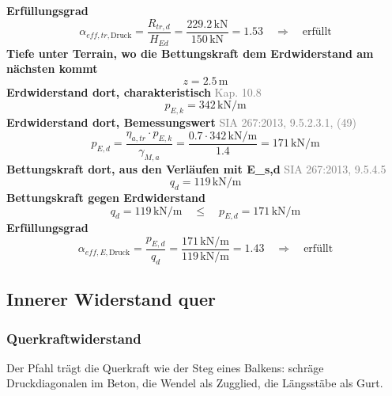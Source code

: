 \documentclass[11pt,a4paper]{article}
\newcommand{\normref}[1]{{\small\textcolor{gray}{#1}}}
\begin{document}
\noindent\textbf{Erfüllungsgrad}
\begin{equation*}
\alpha_{eff,tr,\text{Druck}} = \frac{R_{tr,d}}{H_{Ed}} = \frac{229.2\,\mathrm{kN}}{150\,\mathrm{kN}} = 1.53 \quad \Rightarrow \quad \text{erfüllt}
\end{equation*}
\noindent\textbf{Tiefe unter Terrain, wo die Bettungskraft dem Erdwiderstand am nächsten kommt}
\begin{equation*}
z = 2.5\,\mathrm{m}
\end{equation*}
\noindent\textbf{Erdwiderstand dort, charakteristisch} \hfill \normref{Kap. 10.8}
\begin{equation*}
p_{E,k} = 342\,\mathrm{kN}/\mathrm{m}
\end{equation*}
\noindent\textbf{Erdwiderstand dort, Bemessungswert} \hfill \normref{SIA 267:2013, 9.5.2.3.1, (49)}
\begin{equation*}
p_{E,d} = \frac{\eta_{a,tr} \cdot p_{E,k}}{\gamma_{M,a}} = \frac{0.7 \cdot 342\,\mathrm{kN}/\mathrm{m}}{1.4} = 171\,\mathrm{kN}/\mathrm{m}
\end{equation*}
\noindent\textbf{Bettungskraft dort, aus den Verläufen mit E\_s,d} \hfill \normref{SIA 267:2013, 9.5.4.5}
\begin{equation*}
q_d = 119\,\mathrm{kN}/\mathrm{m}
\end{equation*}
\noindent\textbf{Bettungskraft gegen Erdwiderstand}
\begin{equation*}
q_d = 119\,\mathrm{kN}/\mathrm{m} \quad \le \quad p_{E,d} = 171\,\mathrm{kN}/\mathrm{m}
\end{equation*}
\noindent\textbf{Erfüllungsgrad}
\begin{equation*}
\alpha_{eff,E,\text{Druck}} = \frac{p_{E,d}}{q_d} = \frac{171\,\mathrm{kN}/\mathrm{m}}{119\,\mathrm{kN}/\mathrm{m}} = 1.43 \quad \Rightarrow \quad \text{erfüllt}
\end{equation*}
\subsection{Innerer Widerstand quer}
\subsubsection{Querkraftwiderstand}
Der Pfahl trägt die Querkraft wie der Steg eines Balkens: schräge Druckdiagonalen im Beton, die Wendel als Zugglied, die Längsstäbe als Gurt.
\end{document}
